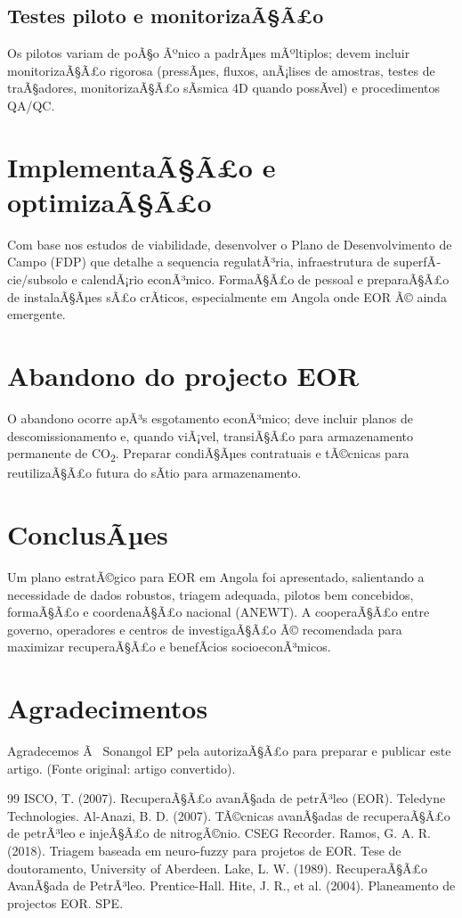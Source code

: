\documentclass[11pt,a4paper]{article}
\begin{document}
\subsection{Testes piloto e monitorizaÃ§Ã£o}
Os pilotos variam de poÃ§o Ãºnico a padrÃµes mÃºltiplos; devem incluir monitorizaÃ§Ã£o rigorosa (pressÃµes, fluxos, anÃ¡lises de amostras, testes de traÃ§adores, monitorizaÃ§Ã£o sÃ­smica 4D quando possÃ­vel) e procedimentos QA/QC.

\section{ImplementaÃ§Ã£o e optimizaÃ§Ã£o}
Com base nos estudos de viabilidade, desenvolver o Plano de Desenvolvimento de Campo (FDP) que detalhe a sequencia regulatÃ³ria, infraestrutura de superfÃ­cie/subsolo e calendÃ¡rio econÃ³mico. FormaÃ§Ã£o de pessoal e preparaÃ§Ã£o de instalaÃ§Ãµes sÃ£o crÃ­ticos, especialmente em Angola onde EOR Ã© ainda emergente.

\section{Abandono do projecto EOR}
O abandono ocorre apÃ³s esgotamento econÃ³mico; deve incluir planos de descomissionamento e, quando viÃ¡vel, transiÃ§Ã£o para armazenamento permanente de CO\textsubscript{2}. Preparar condiÃ§Ãµes contratuais e tÃ©cnicas para reutilizaÃ§Ã£o futura do sÃ­tio para armazenamento.

\section{ConclusÃµes}
Um plano estratÃ©gico para EOR em Angola foi apresentado, salientando a necessidade de dados robustos, triagem adequada, pilotos bem concebidos, formaÃ§Ã£o e coordenaÃ§Ã£o nacional (ANEWT). A cooperaÃ§Ã£o entre governo, operadores e centros de investigaÃ§Ã£o Ã© recomendada para maximizar recuperaÃ§Ã£o e benefÃ­cios socioeconÃ³micos.

\section*{Agradecimentos}
Agradecemos Ã  Sonangol EP pela autorizaÃ§Ã£o para preparar e publicar este artigo. (Fonte original: artigo convertido).

\begin{thebibliography}{99}
 ISCO, T. (2007). RecuperaÃ§Ã£o avanÃ§ada de petrÃ³leo (EOR). Teledyne Technologies.
 Al-Anazi, B. D. (2007). TÃ©cnicas avanÃ§adas de recuperaÃ§Ã£o de petrÃ³leo e injeÃ§Ã£o de nitrogÃ©nio. CSEG Recorder.
 Ramos, G. A. R. (2018). Triagem baseada em neuro-fuzzy para projetos de EOR. Tese de doutoramento, University of Aberdeen.
 Lake, L. W. (1989). RecuperaÃ§Ã£o AvanÃ§ada de PetrÃ³leo. Prentice-Hall.
 Hite, J. R., et al. (2004). Planeamento de projectos EOR. SPE.
\end{thebibliography}
\end{document}
